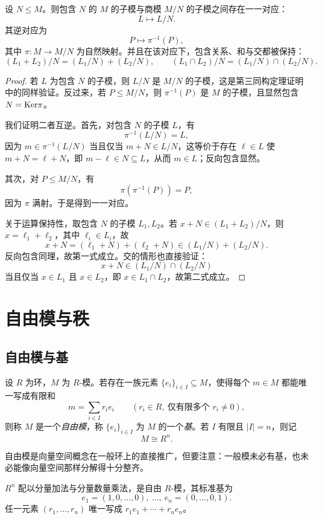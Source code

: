 \begin{theorem}[对应定理]
设 $N\le M$。则包含 $N$ 的 $M$ 的子模与商模 $M/N$ 的子模之间存在一一对应：
\[
L\longmapsto L/N.
\]
其逆对应为
\[
P\longmapsto \pi^{-1}(P),
\]
其中 $\pi\colon M\to M/N$ 为自然映射。并且在该对应下，包含关系、和与交都被保持：
\[
(L_1+L_2)/N=(L_1/N)+(L_2/N),\qquad (L_1\cap L_2)/N=(L_1/N)\cap (L_2/N).
\]
\end{theorem}

\begin{proof}
若 $L$ 为包含 $N$ 的子模，则 $L/N$ 是 $M/N$ 的子模，这是第三同构定理证明中的同样验证。反过来，若 $P\le M/N$，则 $\pi^{-1}(P)$ 是 $M$ 的子模，且显然包含 $N=\mathrm{Ker}\pi$。

我们证明二者互逆。首先，对包含 $N$ 的子模 $L$，有
\[
\pi^{-1}(L/N)=L,
\]
因为 $m\in \pi^{-1}(L/N)$ 当且仅当 $m+N\in L/N$，这等价于存在 $\ell\in L$ 使 $m+N=\ell+N$，即 $m-\ell\in N\subseteq L$，从而 $m\in L$；反向包含显然。

其次，对 $P\le M/N$，有
\[
\pi(\pi^{-1}(P))=P,
\]
因为 $\pi$ 满射。于是得到一一对应。

关于运算保持性，取包含 $N$ 的子模 $L_1,L_2$。若 $x+N\in (L_1+L_2)/N$，则 $x=\ell_1+\ell_2$，其中 $\ell_i\in L_i$，故
\[
x+N=(\ell_1+N)+(\ell_2+N)\in (L_1/N)+(L_2/N).
\]
反向包含同理，故第一式成立。交的情形也直接验证：
\[
x+N\in (L_1/N)\cap(L_2/N)
\]
当且仅当 $x\in L_1$ 且 $x\in L_2$，即 $x\in L_1\cap L_2$，故第二式成立。
\end{proof}

\section{自由模与秩}

\subsection{自由模与基}

\begin{definition}
设 $R$ 为环，$M$ 为 $R$-模。若存在一族元素 $\{e_i\}_{i\in I}\subseteq M$，使得每个 $m\in M$ 都能唯一写成有限和
\[
m=\sum_{i\in I} r_ie_i\qquad (r_i\in R,\ \text{仅有限多个 }r_i\ne 0),
\]
则称 $M$ 是一个\emph{自由模}，称 $\{e_i\}_{i\in I}$ 为 $M$ 的一个\emph{基}。若 $I$ 有限且 $|I|=n$，则记
\[
M\cong R^n.
\]
\end{definition}

自由模是向量空间概念在一般环上的直接推广，但要注意：一般模未必有基，也未必能像向量空间那样分解得十分整齐。

\begin{example}
$R^n$ 配以分量加法与分量数量乘法，是自由 $R$-模，其标准基为
\[
e_1=(1,0,\dots,0),\ \dots,\ e_n=(0,\dots,0,1).
\]
任一元素 $(r_1,\dots,r_n)$ 唯一写成 $r_1e_1+\cdots+r_ne_n$。
\end{example}

